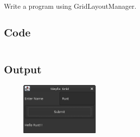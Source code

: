 \documentclass[../main.tex]{subfiles}
\begin{document}
Write a program using GridLayoutManager.

\subsection{Code}
\inputminted[frame=lines, breaklines, breakanywhere, numberblanklines=false]{java}{./programs/prog20/GridLay.java}

\subsection{Output}
\begin{figure}[h!]
	\centering
	\includegraphics[width=0.35\textwidth]{./assets/p20-s1.png}
\end{figure}
\end{document}
